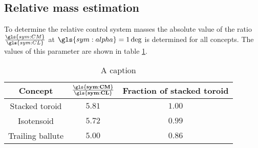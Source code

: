 \subsection{Relative mass estimation}
\label{subsec:controlmassest}
To determine the relative control system masses the absolute value of the ratio $\frac{\gls{sym:CM}}{\gls{sym:CL}}$ at $\gls{sym:alpha}=1\deg$ is determined for all concepts. The values of this parameter are shown in table \ref{tab:controlmass}. 
\begin{table}[h]
	\centering
	\caption{A caption}
	\begin{tabular}{|c|c|c|}
		\hline
		\textbf{Concept} & $\mathbf{\frac{\gls{sym:CM}}{\gls{sym:CL}}}$ & \textbf{Fraction of stacked toroid} \\ \hline \hline
		Stacked toroid & $5.81$ & $1.00$\\
		Isotensoid & $5.72$ & $0.99$\\
		Trailing ballute & $5.00$ & $0.86$\\
		\hline
	\end{tabular}
	\label{tab:controlmass}
\end{table}
